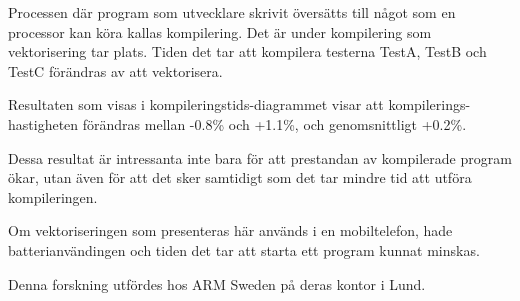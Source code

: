 \documentclass[12pt,a4paper,onecolumn,openright]{report}
\begin{document}
\begin{multicols}{2}
\begin{figure}[H]
\label{plot:cmp_time}
\end{figure}


Processen där program som utvecklare skrivit översätts till något som en processor kan köra kallas kompilering. Det är under kompilering som vektorisering tar plats. Tiden det tar att kompilera testerna TestA, TestB och TestC förändras av att vektorisera.

Resultaten som visas i kompileringstids-diagrammet  visar att kompilerings-hastigheten förändras mellan -0.8\% och +1.1\%, och genomsnittligt +0.2\%.


Dessa resultat är intressanta inte bara för att prestandan av kompilerade program ökar, utan även för att det sker samtidigt som det tar mindre tid att utföra kompileringen.

Om vektoriseringen som presenteras här används i en mobiltelefon, hade batterianvändingen och tiden det tar att starta ett program kunnat minskas.

Denna forskning utfördes hos ARM Sweden på deras kontor i Lund.

\end{multicols}
\end{document}
